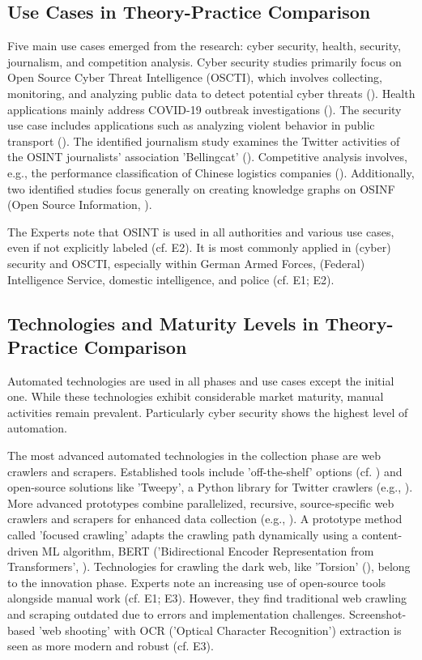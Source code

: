 \documentclass[10pt]{article}
\begin{document}
\subsection{Use Cases in Theory-Practice Comparison}

Five main use cases emerged from the research: cyber security, health, security, journalism,
and competition analysis. Cyber security studies primarily focus on Open Source Cyber Threat
Intelligence (OSCTI), which involves collecting, monitoring, and analyzing public
data to detect potential cyber threats (\cite{Ahuja.2022}).
Health applications mainly address COVID-19 outbreak investigations (\cite{Kpozehouen.2020}).
The security use case includes applications such as
analyzing violent behavior in public transport (\cite{Nobili.2021}). The identified journalism study examines the
Twitter activities of the OSINT journalists' association 'Bellingcat' (\cite{Bar.2023}). Competitive analysis
involves, e.g., the performance classification of Chinese logistics companies (\cite{Tao.2023}).
Additionally, two identified studies focus generally on creating knowledge graphs on OSINF (Open Source Information, \cite{Hu.2023, Ma.2022}).

The Experts note that OSINT is used in all authorities and various use cases, even if not explicitly labeled (cf. E2). It is most commonly applied in (cyber) security and OSCTI, especially within German Armed Forces, (Federal) Intelligence Service, domestic intelligence, and police (cf. E1; E2).

\subsection{Technologies and Maturity Levels in Theory-Practice Comparison} \label{sec:matcomp}

Automated technologies are used in all phases and use cases except the initial one. While these technologies exhibit considerable market maturity, manual activities remain prevalent. Particularly cyber security shows the highest level of automation.

The most advanced automated technologies in the collection phase are web crawlers and scrapers. Established tools include 'off-the-shelf' options (cf. \cite{Middleton.2020}) and open-source solutions like 'Tweepy', a Python library for Twitter crawlers (e.g., \cite{Adewopo.2020}). More advanced prototypes combine parallelized, recursive, source-specific web crawlers and scrapers for enhanced data collection (e.g., \cite{Jenkins.2021}). A prototype method called 'focused crawling' adapts the crawling path dynamically using a content-driven ML algorithm, BERT ('Bidirectional Encoder Representation from Transformers', \cite{Kuehn.2023}). Technologies for crawling the dark web, like 'Torsion' (\cite{Sonawane.2022}), belong to the innovation phase. Experts note an increasing use of open-source tools alongside manual work (cf. E1; E3). However, they find traditional web crawling and scraping outdated due to errors and implementation challenges. Screenshot-based 'web shooting' with OCR ('Optical Character Recognition') extraction is seen as more modern and robust (cf. E3).
\end{document}
